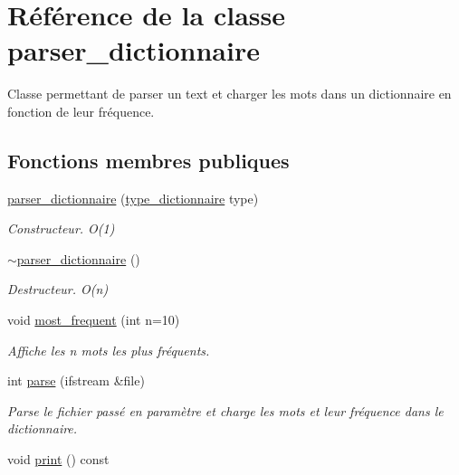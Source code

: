 \hypertarget{classparser__dictionnaire}{\section{Référence de la classe parser\-\_\-dictionnaire}
\label{classparser__dictionnaire}
}


Classe permettant de parser un text et charger les mots dans un dictionnaire en fonction de leur fréquence.  


\subsection*{Fonctions membres publiques}
\begin{DoxyCompactItemize}
\item 
\hypertarget{classparser__dictionnaire_a0b21f50adff68261f12c040e5b3dc4e8}{\hyperlink{classparser__dictionnaire_a0b21f50adff68261f12c040e5b3dc4e8}{parser\-\_\-dictionnaire} (\hyperlink{parser__dictionnaire_8cpp_ad67b09ef02d97f138a9b239b8b124835}{type\-\_\-dictionnaire} type)}\label{classparser__dictionnaire_a0b21f50adff68261f12c040e5b3dc4e8}

\begin{DoxyCompactList}\small\item\em Constructeur. O(1) \end{DoxyCompactList}\item 
\hypertarget{classparser__dictionnaire_a72b3df3b72b41d31b5c2384d3a733c01}{\hyperlink{classparser__dictionnaire_a72b3df3b72b41d31b5c2384d3a733c01}{$\sim$parser\-\_\-dictionnaire} ()}\label{classparser__dictionnaire_a72b3df3b72b41d31b5c2384d3a733c01}

\begin{DoxyCompactList}\small\item\em Destructeur. O(n) \end{DoxyCompactList}\item 
void \hyperlink{classparser__dictionnaire_a9a2f01c85d42e3f0b2e9a4e087f5b90c}{most\-\_\-frequent} (int n=10)
\begin{DoxyCompactList}\small\item\em Affiche les n mots les plus fréquents. \end{DoxyCompactList}\item 
int \hyperlink{classparser__dictionnaire_a7147bb13f32916e81289c654e709ddf8}{parse} (ifstream \&file)
\begin{DoxyCompactList}\small\item\em Parse le fichier passé en paramètre et charge les mots et leur fréquence dans le dictionnaire. \end{DoxyCompactList}\item 
\hypertarget{classparser__dictionnaire_ad4582a4c51effd26f640b4b6440550d2}{void \hyperlink{classparser__dictionnaire_ad4582a4c51effd26f640b4b6440550d2}{print} () const }\label{classparser__dictionnaire_ad4582a4c51effd26f640b4b6440550d2}


\end{DoxyCompactItemize}
